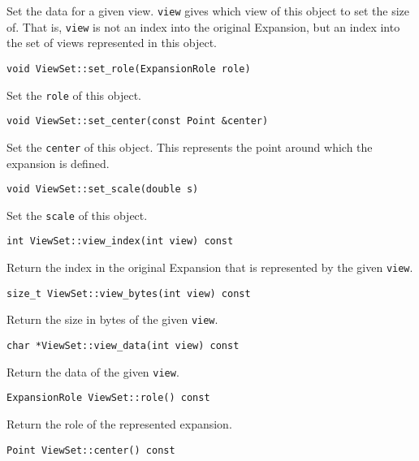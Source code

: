 \noindent Set the data for a given view. \texttt{view} gives which view of this
object to set the size of. That is, \texttt{view} is not an index into the
original Expansion, but an index into the set of views represented in this
object.

\begin{lstlisting}
void ViewSet::set_role(ExpansionRole role)
\end{lstlisting}

\noindent Set the \texttt{role} of this object.

\begin{lstlisting}
void ViewSet::set_center(const Point &center)
\end{lstlisting}

\noindent Set the \texttt{center} of this object. This represents the point
around which the expansion is defined.

\begin{lstlisting}
void ViewSet::set_scale(double s)
\end{lstlisting}

\noindent Set the \texttt{scale} of this object.

\begin{lstlisting}
int ViewSet::view_index(int view) const
\end{lstlisting}

\noindent Return the index in the original Expansion that is represented by the
given \texttt{view}.

\begin{lstlisting}
size_t ViewSet::view_bytes(int view) const
\end{lstlisting}

\noindent Return the size in bytes of the given \texttt{view}.

\begin{lstlisting}
char *ViewSet::view_data(int view) const
\end{lstlisting}

\noindent Return the data of the given \texttt{view}.

\begin{lstlisting}
ExpansionRole ViewSet::role() const
\end{lstlisting}

\noindent Return the role of the represented expansion.

\begin{lstlisting}
Point ViewSet::center() const
\end{lstlisting}

